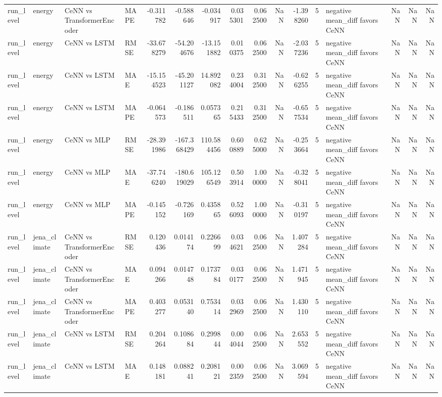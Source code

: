 \begin{tabular}{llllrrrrrrrrlrrr}
run_level & energy & CeNN vs TransformerEncoder & MAPE & -0.311782 & -0.588646 & -0.034917 & 0.035301 & 0.062500 & NaN & -1.398260 & 5 & negative mean_diff favors CeNN & NaN & NaN & NaN \\
run_level & energy & CeNN vs LSTM & RMSE & -33.678279 & -54.204676 & -13.151882 & 0.010375 & 0.062500 & NaN & -2.037236 & 5 & negative mean_diff favors CeNN & NaN & NaN & NaN \\
run_level & energy & CeNN vs LSTM & MAE & -15.154523 & -45.201127 & 14.892082 & 0.234004 & 0.312500 & NaN & -0.626255 & 5 & negative mean_diff favors CeNN & NaN & NaN & NaN \\
run_level & energy & CeNN vs LSTM & MAPE & -0.064573 & -0.186511 & 0.057365 & 0.215433 & 0.312500 & NaN & -0.657534 & 5 & negative mean_diff favors CeNN & NaN & NaN & NaN \\
run_level & energy & CeNN vs MLP & RMSE & -28.391986 & -167.368429 & 110.584456 & 0.600889 & 0.625000 & NaN & -0.253664 & 5 & negative mean_diff favors CeNN & NaN & NaN & NaN \\
run_level & energy & CeNN vs MLP & MAE & -37.746240 & -180.619029 & 105.126549 & 0.503914 & 1.000000 & NaN & -0.328041 & 5 & negative mean_diff favors CeNN & NaN & NaN & NaN \\
run_level & energy & CeNN vs MLP & MAPE & -0.145152 & -0.726169 & 0.435865 & 0.526093 & 1.000000 & NaN & -0.310197 & 5 & negative mean_diff favors CeNN & NaN & NaN & NaN \\
run_level & jena_climate & CeNN vs TransformerEncoder & RMSE & 0.120436 & 0.014174 & 0.226699 & 0.034621 & 0.062500 & NaN & 1.407284 & 5 & negative mean_diff favors CeNN & NaN & NaN & NaN \\
run_level & jena_climate & CeNN vs TransformerEncoder & MAE & 0.094266 & 0.014748 & 0.173784 & 0.030177 & 0.062500 & NaN & 1.471945 & 5 & negative mean_diff favors CeNN & NaN & NaN & NaN \\
run_level & jena_climate & CeNN vs TransformerEncoder & MAPE & 0.403277 & 0.053140 & 0.753414 & 0.032969 & 0.062500 & NaN & 1.430110 & 5 & negative mean_diff favors CeNN & NaN & NaN & NaN \\
run_level & jena_climate & CeNN vs LSTM & RMSE & 0.204264 & 0.108684 & 0.299844 & 0.004044 & 0.062500 & NaN & 2.653552 & 5 & negative mean_diff favors CeNN & NaN & NaN & NaN \\
run_level & jena_climate & CeNN vs LSTM & MAE & 0.148181 & 0.088241 & 0.208121 & 0.002359 & 0.062500 & NaN & 3.069594 & 5 & negative mean_diff favors CeNN & NaN & NaN & NaN \\

\end{tabular}

